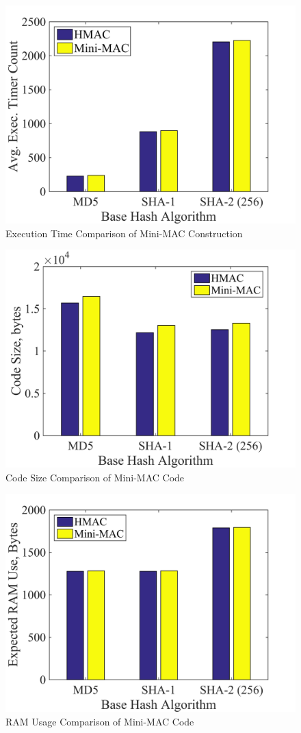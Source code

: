 	\begin{figure}
		\centering
		\includegraphics[width=\columnwidth]{figures/exec_cycles.png}
		\caption{Execution Time Comparison of Mini-MAC Construction}
		\label{fig-execution}
	\end{figure}
	
	\begin{figure}
		\centering
		\includegraphics[width=\columnwidth]{figures/code_size.png}
		\caption{Code Size Comparison of Mini-MAC Code}
		\label{fig-code}
	\end{figure}
	
	\begin{figure}
		\centering
		\includegraphics[width=\columnwidth]{figures/ram_usage.png}
		\caption{RAM Usage Comparison of Mini-MAC Code}
		\label{fig-ram}
	\end{figure}
	